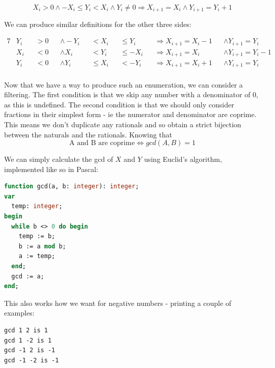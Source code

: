 \documentclass{article}
\begin{document}
    \begin{equation}
      X_i > 0 \wedge
      -X_i \leq Y_i < X_i \wedge
      Y_i \neq 0
    \Rightarrow
      X_{i + 1} = X_i \wedge
      Y_{i + 1} = Y_i + 1
    \end{equation}

    We can produce similar definitions for the other three sides:

    \begin{alignat*}{7}
    &Y_i &&> 0 &&\wedge -Y_i &&< X_i &&\leq Y_i &&\Rightarrow X_{i + 1} = X_i - 1 &&\wedge Y_{i + 1} = Y_i\\
    &X_i &&< 0 &&\wedge X_i &&< Y_i &&\leq -X_i &&\Rightarrow X_{i + 1} = X_i &&\wedge Y_{i + 1} = Y_i - 1\\
    &Y_i &&< 0 &&\wedge Y_i &&\leq X_i &&< -Y_i &&\Rightarrow X_{i + 1} = X_i + 1 &&\wedge Y_{i + 1} = Y_i\\
    \end{alignat*}

    Now that we have a way to produce such an enumeration, we can consider a
    filtering. The first condition is that we skip any number with a
    denominator of 0, as this is undefined. The second condition is that we
    should only consider fractions in their simplest form - ie the numerator
    and denominator are coprime. This means we don't duplicate any rationals
    and so obtain a strict bijection between the naturals and the rationals.
    Knowing that
    \begin{equation}
        \text{A and B are coprime} \Leftrightarrow gcd(A, B) = 1
    \end{equation}

    We can simply calculate the gcd of $X$ and $Y$ using Euclid's algorithm,
    implemented like so in Pascal:

\begin{lstlisting}[language=Pascal, caption=Euclid's algorithm in Pascal]
function gcd(a, b: integer): integer;
var
  temp: integer;
begin
  while b <> 0 do begin
    temp := b;
    b := a mod b;
    a := temp;
  end;
  gcd := a;
end; 
\end{lstlisting}

    This also works how we want for negative numbers - printing a couple of
    examples:

\begin{lstlisting}[caption=GCD behaviour for negative numbers]
gcd 1 2 is 1
gcd 1 -2 is 1
gcd -1 2 is -1
gcd -1 -2 is -1
\end{lstlisting}
\end{document}
